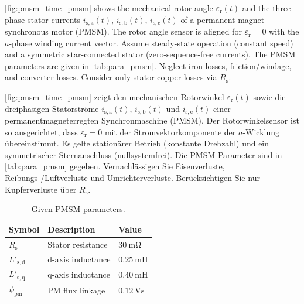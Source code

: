 
\autoref{fig:pmsm_time_pmsm} shows the mechanical rotor angle $\varepsilon_{\mathrm{r}}(t)$ and the three-phase stator currents $i_{\mathrm{s,a}}(t)$, $i_{\mathrm{s,b}}(t)$, $i_{\mathrm{s,c}}(t)$ of a permanent magnet synchronous motor (PMSM). The rotor angle sensor is aligned for $\varepsilon_{\mathrm{r}}=0$ with the $a$-phase winding current vector.
Assume steady-state operation (constant speed) and a symmetric star-connected stator (zero-sequence-free currents). The PMSM parameters are given in \autoref{tab:para_pmsm}.
Neglect iron losses, friction/windage, and converter losses. Consider only stator copper losses via $R_{\mathrm{s}}$.

\begin{germanblock}
	\autoref{fig:pmsm_time_pmsm} zeigt den mechanischen Rotorwinkel $\varepsilon_{\mathrm{r}}(t)$ sowie die dreiphasigen Statorströme $i_{\mathrm{s,a}}(t)$, $i_{\mathrm{s,b}}(t)$ und $i_{\mathrm{s,c}}(t)$ einer permanentmagneterregten Synchronmaschine (PMSM). Der Rotorwinkelsensor ist so ausgerichtet, dass $\varepsilon_{\mathrm{r}}=0$ mit der Stromvektorkomponente der $a$-Wicklung übereinstimmt.
	Es gelte  stationärer Betrieb (konstante Drehzahl) und ein symmetrischer Sternanschluss (nullsystemfrei). Die PMSM-Parameter sind in \autoref{tab:para_pmsm} gegeben. Vernachlässigen Sie Eisenverluste, Reibungs-/Luftverluste und Umrichterverluste. Berücksichtigen Sie nur Kupferverluste über $R_{\mathrm{s}}$.
\end{germanblock}

\begin{table}[htb]
	\caption{Given PMSM parameters.}
	\centering
	\begin{tabular}{lll}\toprule
		Symbol               & Description       & Value                     \\
		\midrule
		$R_{\mathrm{s}}$     & Stator resistance & $\SI{30}{\milli\ohm}$     \\
		$L'_{\mathrm{s,d}}$  & d-axis inductance & $\SI{0.25}{\milli\henry}$ \\
		$L'_{\mathrm{s,q}}$  & q-axis inductance & $\SI{0.40}{\milli\henry}$ \\
		$\psi_{\mathrm{pm}}$ & PM flux linkage   & $\SI{0.12}{\volt\second}$ \\
		\bottomrule
	\end{tabular}
	\label{tab:para_pmsm}
\end{table}

